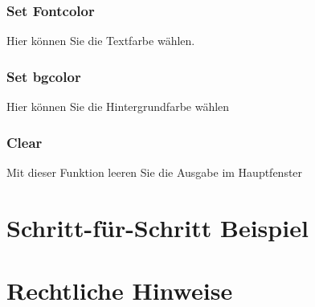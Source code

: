 \documentclass[11pt]{article} %
\begin{document}
\subsubsection{Set Fontcolor}
Hier können Sie die Textfarbe wählen.\\
\subsubsection{Set bgcolor}
Hier können Sie die Hintergrundfarbe wählen
\subsubsection{Clear}
Mit dieser Funktion leeren Sie die Ausgabe im Hauptfenster
\section{Schritt-für-Schritt Beispiel}

\section{Rechtliche Hinweise}
\end{document}
